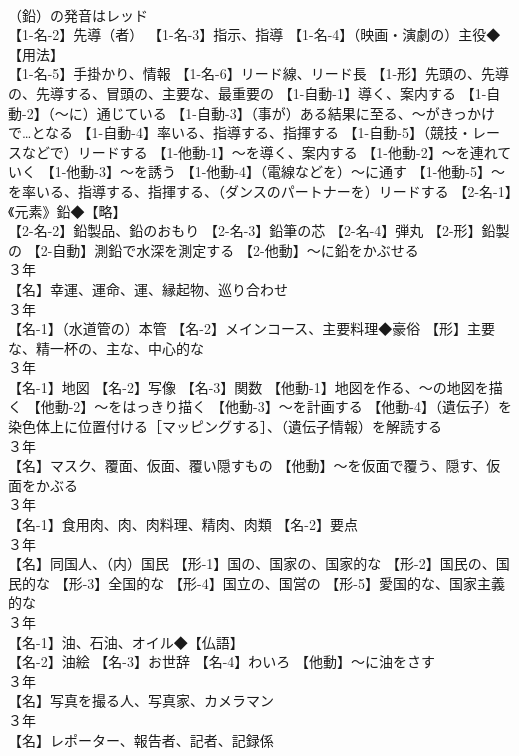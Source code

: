 \documentclass[8pt]{extreport}
\begin{document}
\begin{CJK}{UTF8}{min}
\\	（鉛）の発音はレッド
\\	【1-名-2】先導（者） 【1-名-3】指示、指導 【1-名-4】（映画・演劇の）主役◆【用法】
\\	【1-名-5】手掛かり、情報 【1-名-6】リード線、リード長 【1-形】先頭の、先導の、先導する、冒頭の、主要な、最重要の 【1-自動-1】導く、案内する 【1-自動-2】（～に）通じている 【1-自動-3】（事が）ある結果に至る、～がきっかけで…となる 【1-自動-4】率いる、指導する、指揮する 【1-自動-5】（競技・レースなどで）リードする 【1-他動-1】～を導く、案内する 【1-他動-2】～を連れていく 【1-他動-3】～を誘う 【1-他動-4】（電線などを）～に通す 【1-他動-5】～を率いる、指導する、指揮する、（ダンスのパートナーを）リードする 【2-名-1】《元素》鉛◆【略】
\\	【2-名-2】鉛製品、鉛のおもり 【2-名-3】鉛筆の芯 【2-名-4】弾丸 【2-形】鉛製の 【2-自動】測鉛で水深を測定する 【2-他動】～に鉛をかぶせる
\\	３年	
\\	【名】幸運、運命、運、縁起物、巡り合わせ
\\	３年	
\\	【名-1】（水道管の）本管 【名-2】メインコース、主要料理◆豪俗 【形】主要な、精一杯の、主な、中心的な
\\	３年	
\\	【名-1】地図 【名-2】写像 【名-3】関数 【他動-1】地図を作る、～の地図を描く 【他動-2】～をはっきり描く 【他動-3】～を計画する 【他動-4】（遺伝子）を染色体上に位置付ける［マッピングする］、（遺伝子情報）を解読する
\\	３年	
\\	【名】マスク、覆面、仮面、覆い隠すもの 【他動】～を仮面で覆う、隠す、仮面をかぶる
\\	３年	
\\	【名-1】食用肉、肉、肉料理、精肉、肉類 【名-2】要点
\\	３年	
\\	【名】同国人、（内）国民 【形-1】国の、国家の、国家的な 【形-2】国民の、国民的な 【形-3】全国的な 【形-4】国立の、国営の 【形-5】愛国的な、国家主義的な
\\	３年	
\\	【名-1】油、石油、オイル◆【仏語】
\\	【名-2】油絵 【名-3】お世辞 【名-4】わいろ 【他動】～に油をさす
\\	３年	
\\	【名】写真を撮る人、写真家、カメラマン
\\	３年	
\\	【名】レポーター、報告者、記者、記録係

\end{CJK}
\end{document}
